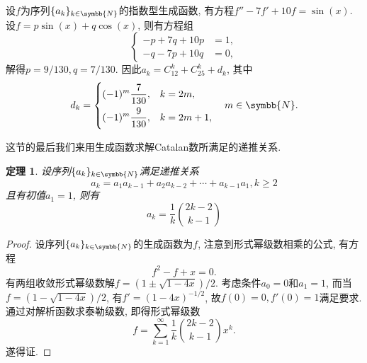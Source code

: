 \documentclass[chinese]{assignment}[2019/10/15]
\newcommand{\BN}{\symbb{N}}
\theoremstyle{plain}
\newtheorem{theorem}{定理}[section]
\begin{document}
    \begin{solution}
        设$f$为序列$\{a_k\}_{k\in\BN}$的指数型生成函数, 有方程$f''-7f'+10f = \sin(x)$. 设$f = p\sin(x) + q\cos(x)$, 则有方程组
        \begin{equation}
            \left\{
            \begin{aligned}
                -p + 7q + 10p &= 1,\\
                -q - 7p + 10q &= 0,
            \end{aligned}
            \right.
        \end{equation}
        解得$p=9/130, q = 7/130$. 因此$a_k=C_12^k+C_25^k + d_k$, 其中
        \begin{equation}
            d_k =
            \left\{\begin{aligned}
                (-1)^m\frac{7}{130}, &\quad k = 2m,\\
                (-1)^m\frac{9}{130}, &\quad k=2m+1,
            \end{aligned}\right.
            \quad m\in\BN.
        \end{equation}
    \end{solution}

    这节的最后我们来用生成函数求解Catalan数所满足的递推关系.

    \begin{theorem}
        设序列$\{a_k\}_{k\in\BN}$满足递推关系
        \begin{equation}
            a_k = a_1a_{k-1}+a_2a_{k-2} + \dotsb + a_{k-1}a_1, k\geq 2
        \end{equation}
        且有初值$a_1 = 1$, 则有
        \begin{equation}
            a_k = \frac{1}{k}\binom{2k-2}{k-1}
        \end{equation}
    \end{theorem}

    \begin{proof}
        设序列$\{a_k\}_{k\in\BN}$的生成函数为$f$, 注意到形式幂级数相乘的公式, 有方程
        \begin{equation}
            f^2-f+x=0.
        \end{equation}
        有两组收敛形式幂级数解$f = \left(1\pm\sqrt{1-4x}\right)\big/2$. 考虑条件$a_0=0$和$a_1=1$, 而当$f=\left(1-\sqrt{1-4x}\right)\big/2$, 有$f' = (1-4x)^{-1/2}$, 故$f(0)=0, f'(0)=1$满足要求. 通过对解析函数求泰勒级数, 即得形式幂级数
        \begin{equation}
            f = \sum_{k=1}^\infty \frac{1}{k}\binom{2k-2}{k-1}x^k.
        \end{equation}
        遂得证.
    \end{proof}
\end{document}
